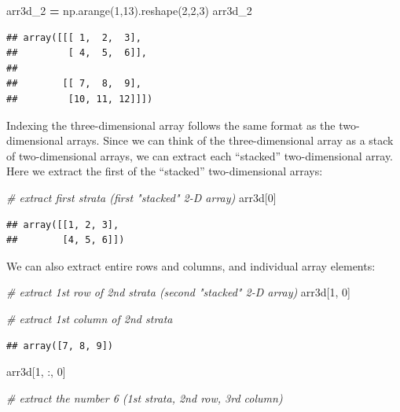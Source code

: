 \documentclass[
]{book}
\newenvironment{Shaded}{\begin{snugshade}}{\end{snugshade}}
\newcommand{\CommentTok}[1]{\textcolor[rgb]{0.56,0.35,0.01}{\textit{#1}}}
\newcommand{\DecValTok}[1]{\textcolor[rgb]{0.00,0.00,0.81}{#1}}
\newcommand{\NormalTok}[1]{#1}
\newcommand{\OperatorTok}[1]{\textcolor[rgb]{0.81,0.36,0.00}{\textbf{#1}}}
\begin{document}
\begin{Shaded}
\begin{Highlighting}[]
\NormalTok{arr3d\_2 }\OperatorTok{=}\NormalTok{ np.arange(}\DecValTok{1}\NormalTok{,}\DecValTok{13}\NormalTok{).reshape(}\DecValTok{2}\NormalTok{,}\DecValTok{2}\NormalTok{,}\DecValTok{3}\NormalTok{)}
\NormalTok{arr3d\_2}
\end{Highlighting}
\end{Shaded}

\begin{verbatim}
## array([[[ 1,  2,  3],
##         [ 4,  5,  6]],
## 
##        [[ 7,  8,  9],
##         [10, 11, 12]]])
\end{verbatim}

Indexing the three-dimensional array follows the same format as the two-dimensional arrays. Since we can think of the three-dimensional array as a stack of two-dimensional arrays, we can extract each ``stacked'' two-dimensional array. Here we extract the first of the ``stacked'' two-dimensional arrays:

\begin{Shaded}
\begin{Highlighting}[]
\CommentTok{\# extract first strata (first "stacked" 2{-}D array)}
\NormalTok{arr3d[}\DecValTok{0}\NormalTok{]}
\end{Highlighting}
\end{Shaded}

\begin{verbatim}
## array([[1, 2, 3],
##        [4, 5, 6]])
\end{verbatim}

We can also extract entire rows and columns, and individual array elements:

\begin{Shaded}
\begin{Highlighting}[]
\CommentTok{\# extract 1st row of 2nd strata (second "stacked" 2{-}D array)}
\NormalTok{arr3d[}\DecValTok{1}\NormalTok{, }\DecValTok{0}\NormalTok{]}

\CommentTok{\# extract 1st column of 2nd strata }
\end{Highlighting}
\end{Shaded}

\begin{verbatim}
## array([7, 8, 9])
\end{verbatim}

\begin{Shaded}
\begin{Highlighting}[]
\NormalTok{arr3d[}\DecValTok{1}\NormalTok{, :, }\DecValTok{0}\NormalTok{]}

\CommentTok{\# extract the number 6 (1st strata, 2nd row, 3rd column)}
\end{Highlighting}
\end{Shaded}
\end{document}
